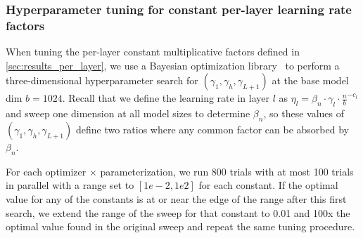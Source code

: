 \subsubsection{Hyperparameter tuning for constant per-layer learning rate factors}
\label{app:tune_constant_factors}
When tuning the per-layer constant multiplicative factors defined in \cref{sec:results_per_layer}, we use a Bayesian optimization library~\citep{google_vizier} to perform a three-dimensional hyperparameter search for $(\gamma_1, \gamma_h, \gamma_{L+1})$ at the base model dim $b=1024$. Recall that we define the learning rate in layer $l$ as $\eta_l = \beta_n \cdot \gamma_l \cdot \frac{n}{b} ^ {-c_l}$ and sweep one dimension at all model sizes to determine $\beta_n$, so these values of $(\gamma_1, \gamma_h, \gamma_{L+1})$ define two ratios where any common factor can be absorbed by $\beta_n$.

For each optimizer $\times$ parameterization, we run 800 trials with at most 100 trials in parallel with a range set to $[1e-2, 1e2]$ for each constant. If the optimal value for any of the constants is at or near the edge of the range after this first search, we extend the range of the sweep for that constant to 0.01 and 100x the optimal value found in the original sweep and repeat the same tuning procedure.

